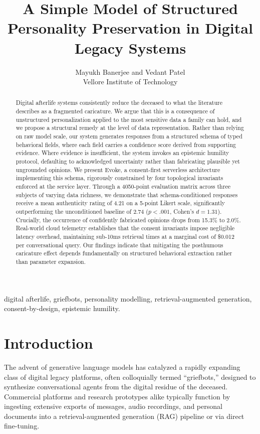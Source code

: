 \documentclass[journal]{IEEEtran}
\title{A Simple Model of Structured Personality Preservation in Digital Legacy Systems}
\author{Mayukh Banerjee and Vedant Patel\\Vellore Institute of Technology}
\begin{document}
\maketitle

\begin{abstract}
Digital afterlife systems consistently reduce the deceased to what the literature describes as a fragmented caricature. We argue that this is a consequence of unstructured personalization applied to the most sensitive data a family can hold, and we propose a structural remedy at the level of data representation. Rather than relying on raw model scale, our system generates responses from a structured schema of typed behavioral fields, where each field carries a confidence score derived from supporting evidence. Where evidence is insufficient, the system invokes an epistemic humility protocol, defaulting to acknowledged uncertainty rather than fabricating plausible yet ungrounded opinions. We present Evoke, a consent-first serverless architecture implementing this schema, rigorously constrained by four topological invariants enforced at the service layer. Through a 4050-point evaluation matrix across three subjects of varying data richness, we demonstrate that schema-conditioned responses receive a mean authenticity rating of 4.21 on a 5-point Likert scale, significantly outperforming the unconditioned baseline of 2.74 ($p < .001$, Cohen's $d = 1.31$). Crucially, the occurrence of confidently fabricated opinions drops from 15.3\% to 2.0\%. Real-world cloud telemetry establishes that the consent invariants impose negligible latency overhead, maintaining sub-10ms retrieval times at a marginal cost of \$0.012 per conversational query. Our findings indicate that mitigating the posthumous caricature effect depends fundamentally on structured behavioral extraction rather than parameter expansion.
\end{abstract}

\begin{IEEEkeywords}
digital afterlife, griefbots, personality modelling, retrieval-augmented generation, consent-by-design, epistemic humility.
\end{IEEEkeywords}

\section{Introduction}
The advent of generative language models has catalyzed a rapidly expanding class of digital legacy platforms, often colloquially termed ``griefbots,'' designed to synthesize conversational agents from the digital residue of the deceased. Commercial platforms and research prototypes alike typically function by ingesting extensive exports of messages, audio recordings, and personal documents into a retrieval-augmented generation (RAG) pipeline or via direct fine-tuning. 
\end{document}
